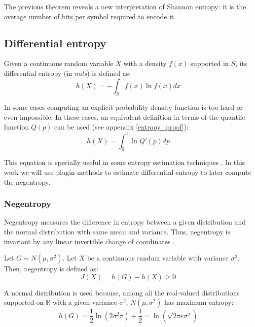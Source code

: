 The previous theorem reveals a new interpretation of Shannon entropy: it is the average number of bits per symbol required to encode it.

\subsection{Differential entropy}
Given a continuous random variable $X$ with a density $f(x)$ supported in $S$, its differential entropy (in \textit{nats}) is defined as:
\begin{equation} \label{eq:differential_entropy}
h(X) = - \int_{S}^{} f(x) \ln f(x) dx
\end{equation}

In some cases computing an explicit probability density function is too hard or even impossible. In these cases, an equivalent definition in terms of the quantile function $Q(p)$ can be used (see appendix \ref{entropy_proof}):
\begin{equation} \label{eq:differential_entropy_q}
h(X) = \int_{0}^{1} \ln Q'(p) dp
\end{equation}

This equation is specially useful in some entropy estimation techniques \parencite{Vasicek}. In this work we will use plugin-methods \parencite{EntropyEstimation} to estimate differential entropy to later compute the negentropy.

\subsubsection{Negentropy}
Negentropy measures the difference in entropy between a given distribution and the normal distribution with same mean and variance. Thus, negentropy is invariant by any linear invertible change of coordinates \parencite{negentropy}. 

Let $G \sim N(\mu, \sigma^2)$. Let $X$ be a continuous random variable with variance $\sigma^2$. Then, negentropy is defined as:
\begin{equation}
J(X) = h(G) - h(X) \geq 0
\end{equation}

A normal distribution is used because, among all the real-valued distributions supported on $\mathbb{R}$ with a given variance $\sigma^2$, $N(\mu, \sigma^2)$ has maximum entropy:
\begin{equation}
h(G) = \frac{1}{2} \ln \left(2\sigma^2\pi\right) + \frac{1}{2} = \ln\left(\sqrt{2\pi e \sigma^2}\right)
\end{equation}

